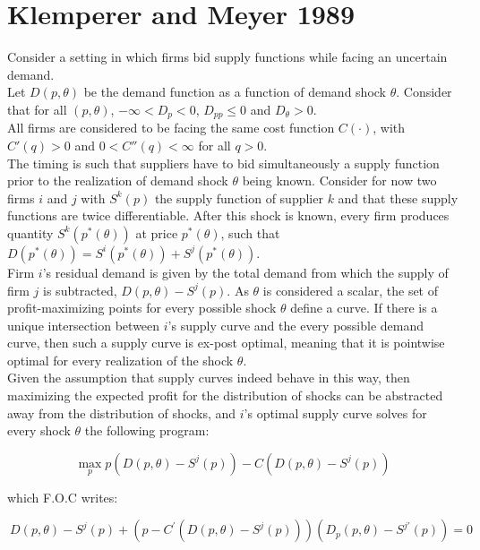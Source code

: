 \section*{Klemperer and Meyer 1989}
Consider a setting in which firms bid supply functions while facing an uncertain demand. \\

Let $D(p,\theta)$ be the demand function as a function of demand shock $\theta$. Consider that for all $(p,\theta)$, $-\infty<D_p<0$, $D_{pp}\leq 0$ and $D_\theta>0$.\\

All firms are considered to be facing the same cost function $C(\cdot)$, with $C'(q)>0$ and $0<C''(q)<\infty$ for all $q>0$.\\

The timing is such that suppliers have to bid simultaneously a supply function prior to the realization of demand shock $\theta$ being known. Consider for now two firms $i$ and $j$ with $S^k(p)$ the supply function of supplier $k$ and that these supply functions are twice differentiable. After this shock is known, every firm produces quantity $S^k(p^*(\theta))$ at price $p^*(\theta)$, such that $D(p^*(\theta)) = S^i(p^*(\theta)) + S^j(p^*(\theta))$.\\

Firm $i$'s residual demand is given by the total demand from which the supply of firm $j$ is subtracted, $D(p,\theta) - S^j(p)$. As $\theta$ is considered a scalar, the set of profit-maximizing points for every possible shock $\theta$ define a curve. If there is a unique intersection between $i$'s supply curve and the every possible demand curve, then such a supply curve is ex-post optimal, meaning that it is pointwise optimal for every realization of the shock $\theta$. \\

Given the assumption that supply curves indeed behave in this way, then maximizing the expected profit for the distribution of shocks can be abstracted away from the distribution of shocks, and $i$'s optimal supply curve solves for every shock $\theta$ the following program:

\begin{equation}\label{maxKM}
\max_p p\left( D(p,\theta) - S^j(p)\right) - C\left( D(p,\theta) - S^j(p)\right) 
\end{equation}

which F.O.C writes:

\begin{equation}\label{KMfoc}
\ D(p,\theta) - S^j(p) + \left( p - C^\prime\left( D(p,\theta) - S^j(p)\right)    \right)\left(  D_p(p,\theta)   - S^{j\prime}(p)\right) = 0
\end{equation}

